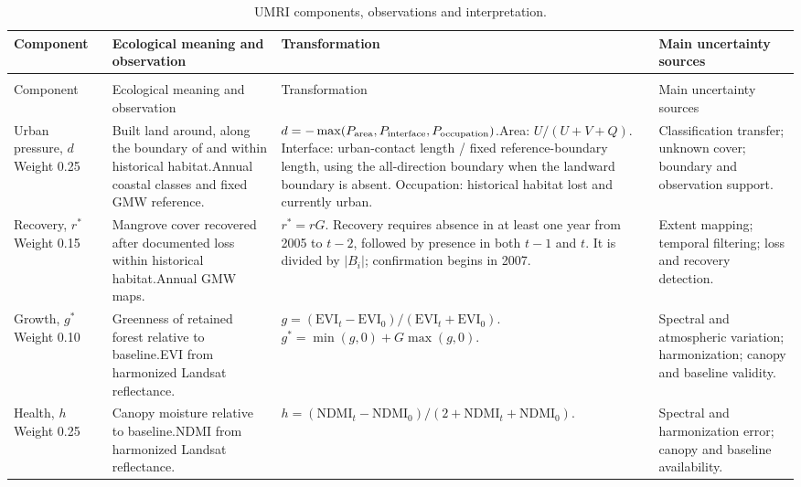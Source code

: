 \clearpage
\begingroup\small\setlength{\tabcolsep}{3pt}\renewcommand{\arraystretch}{1.12}
\begin{longtable}{@{}>{\raggedright\arraybackslash}p{25mm}>{\raggedright\arraybackslash}p{42mm}>{\raggedright\arraybackslash}p{64mm}>{\raggedright\arraybackslash}p{29mm}@{}}
\caption{UMRI components, observations and interpretation.}\label{tab:si_components}\\
\toprule
Component & Ecological meaning and observation & Transformation & Main uncertainty sources\\
\midrule
\endfirsthead
\multicolumn{4}{l}{\small\textit{Supplementary Table \thetable\ continued}}\\
\toprule
Component & Ecological meaning and observation & Transformation & Main uncertainty sources\\
\midrule
\endhead
\bottomrule
\endfoot
Urban pressure, $d$\newline Weight 0.25 & Built land around, along the boundary of and within historical habitat.\newline Annual coastal classes and fixed GMW reference. & $d=-\max(P_{\rm area},P_{\rm interface},P_{\rm occupation})$.\newline Area: $U/(U+V+Q)$. Interface: urban-contact length / fixed reference-boundary length, using the all-direction boundary when the landward boundary is absent. Occupation: historical habitat lost and currently urban. & Classification transfer; unknown cover; boundary and observation support.\\
Recovery, $r^\ast$\newline Weight 0.15 & Mangrove cover recovered after documented loss within historical habitat.\newline Annual GMW maps. & $r^\ast=rG$. Recovery requires absence in at least one year from 2005 to $t-2$, followed by presence in both $t-1$ and $t$. It is divided by $|B_i|$; confirmation begins in 2007. & Extent mapping; temporal filtering; loss and recovery detection.\\
Growth, $g^\ast$\newline Weight 0.10 & Greenness of retained forest relative to baseline.\newline EVI from harmonized Landsat reflectance. & $g=(\mathrm{EVI}_t-\mathrm{EVI}_0)/(\mathrm{EVI}_t+\mathrm{EVI}_0)$.\newline $g^\ast=\min(g,0)+G\max(g,0)$. & Spectral and atmospheric variation; harmonization; canopy and baseline validity.\\
Health, $h$\newline Weight 0.25 & Canopy moisture relative to baseline.\newline NDMI from harmonized Landsat reflectance. & $h=(\mathrm{NDMI}_t-\mathrm{NDMI}_0)/$\newline $(2+\mathrm{NDMI}_t+\mathrm{NDMI}_0)$. & Spectral and harmonization error; canopy and baseline availability.\\

\end{longtable}
